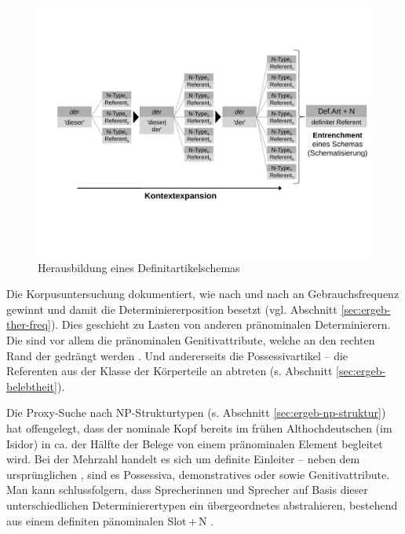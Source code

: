 \begin{figure}
\begin{center}
  \includegraphics[width=\textwidth]{images/expansionbw.pdf}
\caption {Herausbildung eines Definitartikelschemas} 
\label{abb:entrenchment-ther}
\end{center}
\end{figure} 

Die Korpusuntersuchung  dokumentiert, wie  nach und nach an Gebrauchsfrequenz gewinnt und damit die Determiniererposition besetzt (vgl. Abschnitt \ref{sec:ergeb-ther-freq}). Dies geschieht zu Lasten von anderen pränominalen Determinierern. Die  sind vor allem die pränominalen  Genitivattribute, welche an den rechten Rand der  gedrängt werden \parencite[zur weiterführenden Diskussion s.][]{Demske2001}. Und andererseits die  Possessivartikel -- die  Referenten aus der Klasse der Körperteile an  abtreten (s. Abschnitt \ref{sec:ergeb-belebtheit}). 

Die Proxy-Suche  nach NP-Strukturtypen  (s. Abschnitt \ref{sec:ergeb-np-struktur}) hat offengelegt, dass der nominale Kopf bereits im frühen Althochdeutschen (im Isidor) in ca. der Hälfte der Belege von einem pränominalen Element begleitet wird. Bei der Mehrzahl handelt es sich um definite Einleiter -- neben dem ursprünglichen  , sind es  Possessiva, demonstratives  oder  sowie  Genitivattribute. Man kann schlussfolgern, dass Sprecherinnen und Sprecher auf Basis dieser unterschiedlichen Determinierertypen ein übergeordnetes  abstrahieren, bestehend aus einem definiten pänominalen Slot\,+\,N \parencite[ähnlich fürs Altenglische][]{Sommerer2011}. 
  
